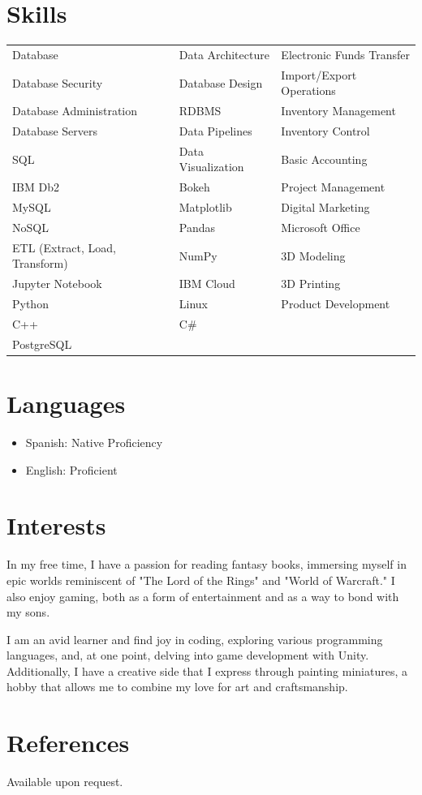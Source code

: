 \documentclass[a4paper,10pt]{article}
\begin{document}
\section*{Skills}
\begin{tabular}{p{4.5cm}p{4.5cm}p{4.5cm}}
    Database & Data Architecture & Electronic Funds Transfer \\
    Database Security & Database Design & Import/Export Operations \\
    Database Administration & RDBMS & Inventory Management \\
    Database Servers & Data Pipelines & Inventory Control \\
    SQL & Data Visualization & Basic Accounting \\
    IBM Db2 & Bokeh & Project Management \\
    MySQL & Matplotlib & Digital Marketing \\
    NoSQL & Pandas & Microsoft Office \\
    ETL (Extract, Load, Transform) & NumPy & 3D Modeling \\
    Jupyter Notebook & IBM Cloud & 3D Printing \\
    Python & Linux & Product Development \\
    C++ & C\# & \\
    PostgreSQL & & \\
\end{tabular}

\section*{Languages}
\begin{itemize}
    \item Spanish: Native Proficiency
    \item English: Proficient
\end{itemize}

\section*{Interests}
In my free time, I have a passion for reading fantasy books, immersing myself in epic worlds reminiscent of "The Lord of the Rings" and "World of Warcraft." I also enjoy gaming, both as a form of entertainment and as a way to bond with my sons. 

I am an avid learner and find joy in coding, exploring various programming languages, and, at one point, delving into game development with Unity. Additionally, I have a creative side that I express through painting miniatures, a hobby that allows me to combine my love for art and craftsmanship.


\section*{References}
Available upon request.
\end{document}
